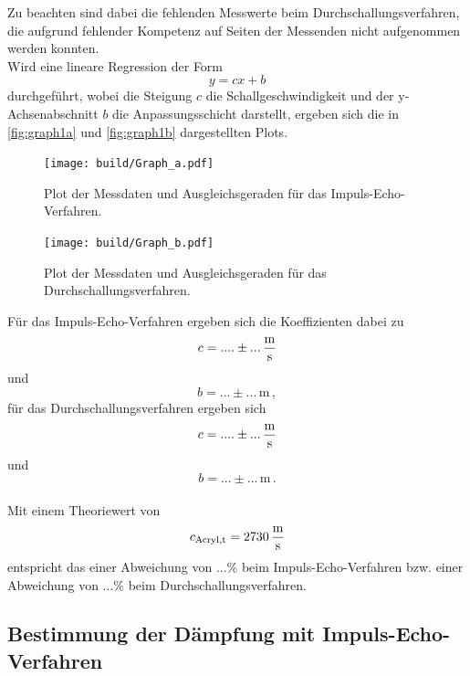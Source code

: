 Zu beachten sind dabei die fehlenden Messwerte beim Durchschallungsverfahren, die aufgrund fehlender Kompetenz auf Seiten der Messenden nicht aufgenommen werden konnten. \\

Wird eine lineare Regression der Form
\begin{equation*}
    y = c x + b
\end{equation*}
durchgeführt, wobei die Steigung $c$ die Schallgeschwindigkeit und der y-Achsenabschnitt $b$ die Anpassungsschicht darstellt, ergeben sich die in \autoref{fig:graph1a} und \autoref{fig:graph1b} dargestellten Plots.
    
\begin{figure}[H]
        \centering
        \texttt{[image: build/Graph\_a.pdf]} 
        \caption{Plot der Messdaten und Ausgleichsgeraden für das Impuls-Echo-Verfahren.}
        \label{fig:graph1a}
\end{figure}

\begin{figure}[H]
    \centering
    \texttt{[image: build/Graph\_b.pdf]} 
    \caption{Plot der Messdaten und Ausgleichsgeraden für das Durchschallungsverfahren.}
    \label{fig:graph1b}
\end{figure}

Für das Impuls-Echo-Verfahren ergeben sich die Koeffizienten dabei zu
\begin{equation*}
    c = .... \pm ... \,\unit{\frac{\meter}{\second}}
\end{equation*}
und
\begin{equation*}
    b = ... \pm ... \,\unit{\meter} \,,
\end{equation*}
für das Durchschallungsverfahren ergeben sich
\begin{equation*}
    c = .... \pm ... \,\unit{\frac{\meter}{\second}}
\end{equation*}
und
\begin{equation*}
    b = ... \pm ... \,\unit{\meter} \,.
\end{equation*} \\

Mit einem Theoriewert von
\begin{equation*}
    c_{\text{Acryl},\text{t}} = 2730 \,\unit{\frac{\meter}{\second}} 
\end{equation*}
entspricht das einer Abweichung von $... \%$ beim Impuls-Echo-Verfahren bzw. einer Abweichung von $... \%$ beim Durchschallungsverfahren.


\subsection{Bestimmung der Dämpfung mit Impuls-Echo-Verfahren}

